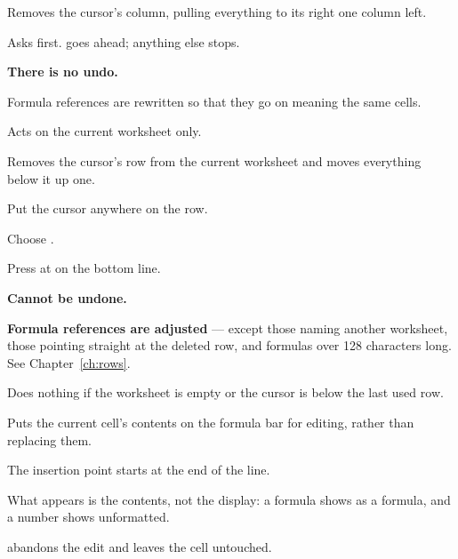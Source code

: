 Removes the cursor's column, pulling everything to its right one column left.

\begin{ccsteps}
\item Asks  first.  goes ahead; anything else
stops.
\item \textbf{There is no undo.}
\item Formula references are rewritten so that they go on meaning the same
cells.
\item Acts on the current worksheet only.
\end{ccsteps}


Removes the cursor's row from the current worksheet and moves everything below
it up one.

\begin{ccprocedure}[]
\item Put the cursor anywhere on the row.
\item Choose .
\item Press  at  on the bottom line.
\end{ccprocedure}

\begin{ccsteps}
\item \textbf{Cannot be undone.}
\item \textbf{Formula references are adjusted} --- except those naming another
worksheet, those pointing straight at the deleted row, and formulas over 128
characters long. See Chapter~\ref{ch:rows}.
\item Does nothing if the worksheet is empty or the cursor is below the last
used row.
\end{ccsteps}


Puts the current cell's contents on the formula bar for editing, rather than
replacing them.

\begin{ccsteps}
\item The insertion point starts at the end of the line.
\item What appears is the contents, not the display: a formula shows as a
formula, and a number shows unformatted.
\item {} abandons the edit and leaves the cell untouched.
\end{ccsteps}


